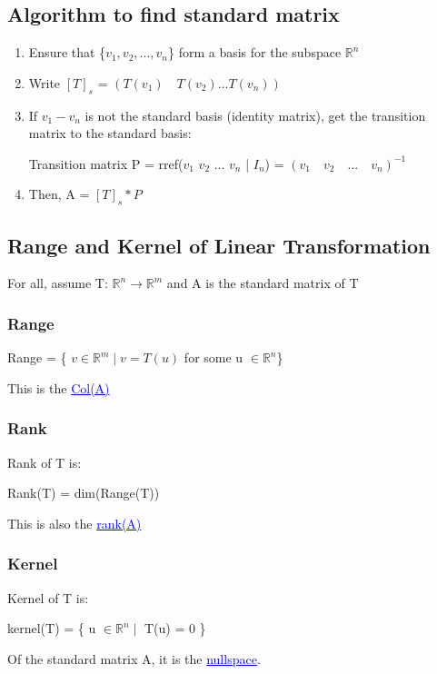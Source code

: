 \documentclass{article}
\newcommand{\bul}[1]{\textcolor{blue}{\underline{#1}}}
\begin{document}
\subsection{Algorithm to find standard matrix}
\begin{enumerate}
    \item Ensure that \{$v_1,v_2,...,v_n$\} form a basis for the subspace $\mathbb{R}^n$
    \item Write $[T]_s$ = $(T(v_1)\quad T(v_2)...T(v_n))$
    \item If $v_1-v_n$ is not the standard basis (identity matrix), get the transition matrix to the standard basis:
\begin{center}
    Transition matrix P = rref($v_1$ $v_2$ ... $v_n$ | $I_n$) = $(v_1\quad v_2\quad...\quad v_n)^{-1}$
\end{center}
    \item Then, A = $[T]_s * P$
\end{enumerate}

\subsection{Range and Kernel of Linear Transformation}
For all, assume T: $\mathbb{R}^n \rightarrow \mathbb{R}^m$ and A is the standard matrix of T
\subsubsection{Range}
\begin{center}
    Range = \{ $v \in \mathbb{R}^m \mid v = T(u)$ for some u $\in \mathbb{R}^n$\}
\end{center}
This is the \bul{Col(A)}

\subsubsection{Rank}
Rank of T is:
\begin{center}
    Rank(T) = dim(Range(T))
\end{center}
This is also the \bul{rank(A)}

\subsubsection{Kernel}
Kernel of T is:
\begin{center}
    kernel(T) = \{ u $\in \mathbb{R}^n \mid$ T(u) = 0 \}
\end{center}
Of the standard matrix A, it is the \bul{nullspace}.
\end{document}
